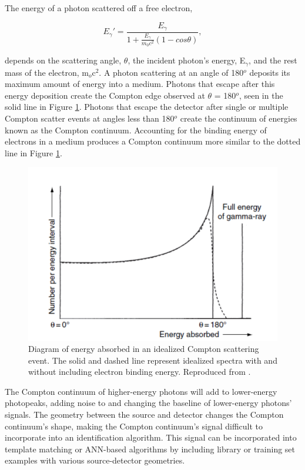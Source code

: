 The energy of a photon scattered off a free electron,

\begin{equation} \label{eq:compton_scatter}
E_{\gamma}' = \frac{E_{\gamma}}{1 + \frac{E_{\gamma}}{m_{0} c^2} (1-cos\theta)},
\end{equation}

depends on the scattering angle, $\theta$, the incident photon's energy, E$_{\gamma}$, and the rest mass of the electron, m$_{o}$c$^{2}$. A photon scattering at an angle of 180$^{o}$ deposits its maximum amount of energy into a medium. Photons that escape after this energy deposition create the Compton edge observed at $\theta$ = 180$^{o}$, seen in the solid line in Figure \ref{fig:ideal_compton}. Photons that escape the detector after single or multiple Compton scatter events at angles less than 180$^{o}$ create the continuum of energies known as the Compton continuum. Accounting for the binding energy of electrons in a medium produces a Compton continuum more similar to the dotted line in Figure \ref{fig:ideal_compton}.

\begin{figure}[H]
	\centering
	\includegraphics[width=0.75\linewidth]{images/ideal_compton}
	\caption{Diagram of energy absorbed in an idealized Compton scattering event. The solid and dashed line represent idealized spectra with and without including electron binding energy. Reproduced from \cite{gilmore}.}
	\label{fig:ideal_compton}
\end{figure}

The Compton continuum of higher-energy photons will add to lower-energy photopeaks, adding noise to and changing the baseline of lower-energy photons' signals. The geometry between the source and detector changes the Compton continuum's shape, making the Compton continuum's signal difficult to incorporate into an identification algorithm. This signal can be incorporated into template matching or ANN-based algorithms by including library or training set examples with various source-detector geometries.





